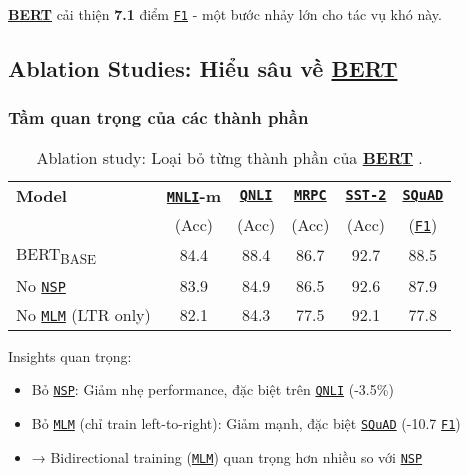 \hyperref[acro:bert]{\textbf{BERT}} cải thiện \textbf{7.1} điểm \hyperref[acro:f1]{\texttt{F1}} - một bước nhảy lớn cho tác vụ khó này.

\subsection{Ablation Studies: Hiểu sâu về \hyperref[acro:bert]{\textbf{BERT}}}
\label{ssec:ablation_study_bert}

\subsubsection{Tầm quan trọng của các thành phần}
\begin{table}[H]
    \centering
    \caption{Ablation study: Loại bỏ từng thành phần của \hyperref[acro:bert]{\textbf{BERT}} \cite{devlin2018bert}.}
    \label{tab:ablation_components}
    \begin{tabular}{lccccc}
        \toprule
        \textbf{Model} & \textbf{\hyperref[acro:mnli]{\texttt{MNLI}}-m} & \textbf{\hyperref[acro:qnli]{\texttt{QNLI}}} & \textbf{\hyperref[acro:mrpc]{\texttt{MRPC}}} & \textbf{\hyperref[acro:sst2]{\texttt{SST-2}}} & \textbf{\hyperref[acro:squad]{\texttt{SQuAD}}} \\
        & (Acc) & (Acc) & (Acc) & (Acc) & (\hyperref[acro:f1]{\texttt{F1}}) \\
        \midrule
        BERT\textsubscript{BASE} & 84.4 & 88.4 & 86.7 & 92.7 & 88.5 \\
        \midrule
        No \hyperref[acro:nsp]{\texttt{NSP}} & 83.9 & 84.9 & 86.5 & 92.6 & 87.9 \\
        No \hyperref[acro:mlm]{\texttt{MLM}} (LTR only) & 82.1 & 84.3 & 77.5 & 92.1 & 77.8 \\
        \bottomrule
    \end{tabular}
\end{table}

Insights quan trọng:
\begin{itemize}
    \item Bỏ \hyperref[acro:nsp]{\texttt{NSP}}: Giảm nhẹ performance, đặc biệt trên \hyperref[acro:qnli]{\texttt{QNLI}} (-3.5\%)
    \item Bỏ \hyperref[acro:mlm]{\texttt{MLM}} (chỉ train left-to-right): Giảm mạnh, đặc biệt \hyperref[acro:squad]{\texttt{SQuAD}} (-10.7 \hyperref[acro:f1]{\texttt{F1}})
    \item → Bidirectional training (\hyperref[acro:mlm]{\texttt{MLM}}) quan trọng hơn nhiều so với \hyperref[acro:nsp]{\texttt{NSP}}
\end{itemize}

